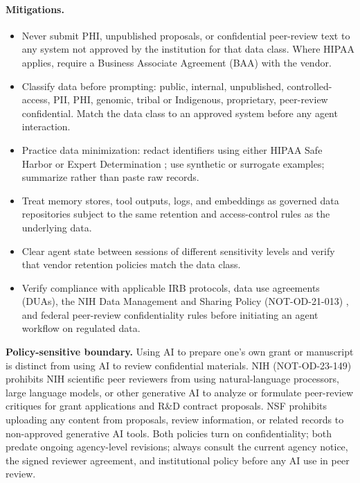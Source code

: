 \documentclass[11pt,letterpaper]{article}
\begin{document}
\paragraph{Mitigations.}
\begin{itemize}[leftmargin=*]
    \item Never submit PHI, unpublished proposals, or confidential peer-review text to any system not approved by the institution for that data class. Where HIPAA applies, require a Business Associate Agreement (BAA) with the vendor.
    \item Classify data before prompting: public, internal, unpublished, controlled-access, PII, PHI, genomic, tribal or Indigenous, proprietary, peer-review confidential. Match the data class to an approved system before any agent interaction.
    \item Practice data minimization: redact identifiers using either HIPAA Safe Harbor or Expert Determination \cite{HHS2012Deidentification}; use synthetic or surrogate examples; summarize rather than paste raw records.
    \item Treat memory stores, tool outputs, logs, and embeddings as governed data repositories subject to the same retention and access-control rules as the underlying data.
    \item Clear agent state between sessions of different sensitivity levels and verify that vendor retention policies match the data class.
    \item Verify compliance with applicable IRB protocols, data use agreements (DUAs), the NIH Data Management and Sharing Policy (NOT-OD-21-013) \cite{NIH2020DMSP}, and federal peer-review confidentiality rules before initiating an agent workflow on regulated data.
\end{itemize}

\textbf{Policy-sensitive boundary.} Using AI to prepare one's own grant or manuscript is distinct from using AI to review confidential materials. NIH (NOT-OD-23-149) prohibits NIH scientific peer reviewers from using natural-language processors, large language models, or other generative AI to analyze or formulate peer-review critiques for grant applications and R\&D contract proposals. NSF prohibits uploading any content from proposals, review information, or related records to non-approved generative AI tools. Both policies turn on confidentiality; both predate ongoing agency-level revisions; always consult the current agency notice, the signed reviewer agreement, and institutional policy before any AI use in peer review.
\end{document}
